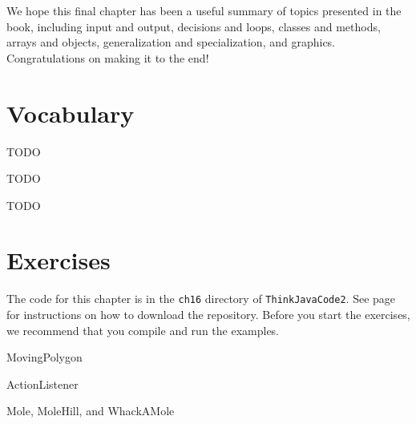 We hope this final chapter has been a useful summary of topics presented in the book, including input and output, decisions and loops, classes and methods, arrays and objects, generalization and specialization, and graphics.
Congratulations on making it to the end!


\section{Vocabulary}

\begin{description}

TODO

TODO

TODO

\end{description}


\section{Exercises}

The code for this chapter is in the {\tt ch16} directory of {\tt ThinkJavaCode2}.
See page~\pageref{code} for instructions on how to download the repository.
Before you start the exercises, we recommend that you compile and run the examples.


\begin{exercise}
MovingPolygon
\end{exercise}


\begin{exercise}
ActionListener
\end{exercise}


\begin{exercise}
Mole, MoleHill, and WhackAMole
\end{exercise}
